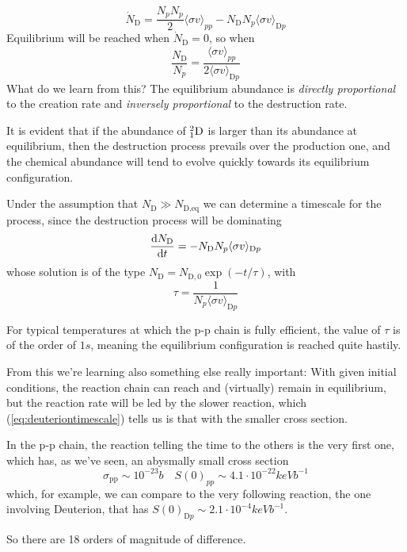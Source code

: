 \begin{equation*}
    \dot{N}_{\text{D}} = \frac{N_{p}N_{p}}{2}\langle \sigma v \rangle_{pp}-N_{\text{D}}N_{p}\langle \sigma v \rangle_{\text{D}p}
\end{equation*}
Equilibrium will be reached when $\dot{N}_{\text{D}} = 0$, so when
\begin{equation*}
    \frac{N_{\text{D}}}{N_{p}} = \frac{\langle \sigma v \rangle_{pp}}{2\langle \sigma v \rangle_{\text{D}p}}
\end{equation*}
What do we learn from this? The equilibrium abundance is \emph{directly proportional} to the creation rate and \emph{inversely proportional} to the destruction rate.
\par It is evident that if the abundance of $\element{D}{2}{1}$ is larger than its abundance at equilibrium, then the destruction process prevails over the production one, and the chemical abundance will tend to evolve quickly towards its equilibrium configuration.
\par Under the assumption that $N_{\text{D}} \gg N_{\text{D}, \text{eq}}$ we can determine a timescale for the process, since the destruction process will be dominating
\begin{equation}
    \der{N_{\text{D}}}{t} = -N_{\text{D}}N_{p}\langle \sigma v \rangle_{\text{D}p}
    \label{eq:deuterionequilibrium}
\end{equation}
whose solution is of the type $N_{\text{D}} = N_{\text{D},0}\exp(-t/\tau)$, with
\begin{equation}
    \tau = \frac{1}{N_{p}\langle \sigma v \rangle_{\text{D}p}}
    \label{eq:deuteriontimescale}
\end{equation}
\par For typical temperatures at which the p-p chain is fully efficient, the value of $\tau$ is of the order of $1\unit{s}$, meaning the equilibrium configuration is reached quite hastily.
\par From this we're learning also something else really important: With given initial conditions, the reaction chain can reach and (virtually) remain in equilibrium, but the reaction rate will be led by the slower reaction, which (\ref{eq:deuteriontimescale}) tells us is that with the smaller cross section.
\par In the p-p chain, the reaction telling the time to the others is the very first one, which has, as we've seen, an abysmally small cross section
\begin{equation*}
    \sigma_{\text{pp}}\sim 10^{-23}\unit{b} \quad S(0)_{pp}\sim 4.1\cdot 10^{-22}\unit{keV}\unit{b}^{-1}
\end{equation*}
which, for example, we can compare to the very following reaction, the one involving Deuterion, that has $S(0)_{\text{D}p}\sim 2.1\cdot 10^{-4}\unit{keV}\unit{b}^{-1}$.
\par So there are 18 orders of magnitude of difference.
